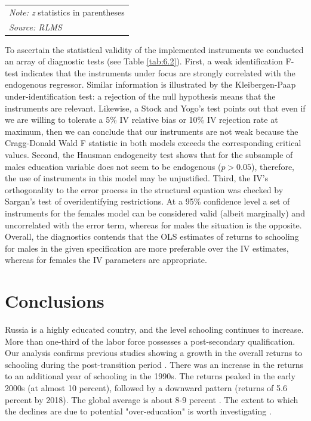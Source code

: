 \documentclass[alpha-refs]{wiley-article-01g}
\begin{document}
\begin{table}[h!]
\begin{tabular}{l*{2}{c}}
		\hline\hline
		\multicolumn{3}{l}{\footnotesize  \textit{Note: z} statistics in parentheses}\\
		\multicolumn{3}{l}{\footnotesize  \textit{Source: RLMS}}\\
	\end{tabular}
\end{table}

To ascertain the statistical validity of the implemented instruments we conducted an array of diagnostic tests (see Table \ref{tab:6.2}). First, a weak identification F-test indicates that the instruments under focus are strongly correlated with the endogenous regressor. Similar information is illustrated by the Kleibergen-Paap under-identification test: a rejection of the null hypothesis means that the instruments are relevant. Likewise, a Stock and Yogo's test points out that even if we are willing to tolerate a 5\% IV relative bias or 10\% IV rejection rate at maximum, then we can conclude that our instruments are not weak because the Cragg-Donald Wald F statistic in both models exceeds the corresponding critical values. Second, the Hausman endogeneity test shows that for the subsample of males education variable does not seem to be endogenous ($p>0.05$), therefore, the use of instruments in this model may be unjustified. Third, the IV's orthogonality to the error process in the structural equation was checked by Sargan's test of overidentifying restrictions. At a 95\% confidence level a set of instruments for the females model can be considered valid (albeit marginally) and uncorrelated with the error term, whereas for males the situation is the opposite. Overall, the diagnostics contends that the OLS estimates of returns to schooling for males in the given specification are more preferable over the IV estimates, whereas for females the IV parameters are appropriate.

\section{Conclusions}

Russia is a highly educated country, and the level schooling continues to increase. More than one-third of the labor force possesses a post-secondary qualification. Our analysis confirms previous studies showing a growth in the overall returns to schooling during the post-transition period \parencite{Brainerd1998,Clark2003,Vernon2002}. There was an increase in the returns to an additional year of schooling in the 1990s. The returns peaked in the early 2000s (at almost 10 percent), followed by a downward pattern (returns of 5.6 percent by 2018). The global average is about 8-9 percent \parencite{Psacharopoulos_Patrinos2018}. The extent to which the declines are due to potential "over-education" is worth investigating \parencite{Gimpelson2019}.
\end{document}
